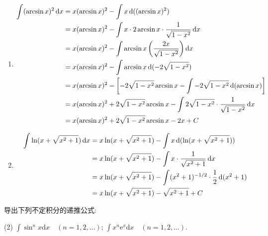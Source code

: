 \begin{solution}
\begin{enumerate}
        \item %
              \begin{align*}
                  \int (\arcsin x)^2 \operatorname{d\!} x & = x (\arcsin x)^2 - \int x \operatorname{d}((\arcsin x)^2)                                                      \\
                                            & = x (\arcsin x)^2 - \int x \cdot 2 \arcsin x \cdot \frac{1}{\sqrt{1-x^2}} \operatorname{d\!} x                     \\
                                            & = x (\arcsin x)^2 - \int \arcsin x \left( \frac{2x}{\sqrt{1-x^2}} \right) \operatorname{d\!} x                     \\
                                            & = x (\arcsin x)^2 - \int \arcsin x \operatorname{d}(-2\sqrt{1-x^2})                                             \\
                                            & = x (\arcsin x)^2 - \left[ -2\sqrt{1-x^2} \arcsin x - \int -2\sqrt{1-x^2} \operatorname{d}(\arcsin x) \right]   \\
                                            & = x (\arcsin x)^2 + 2\sqrt{1-x^2} \arcsin x - \int 2\sqrt{1-x^2} \cdot \frac{1}{\sqrt{1-x^2}} \operatorname{d\!} x \\
                                            & = x (\arcsin x)^2 + 2\sqrt{1-x^2} \arcsin x - 2x + C
              \end{align*}

        \item %
              \begin{align*}
                  \int \ln(x + \sqrt{x^2 + 1}) \operatorname{d\!} x & = x \ln(x + \sqrt{x^2 + 1}) - \int x \operatorname{d}(\ln(x + \sqrt{x^2 + 1}))                  \\
                                                      & = x \ln(x + \sqrt{x^2 + 1}) - \int x \cdot \frac{1}{\sqrt{x^2 + 1}} \operatorname{d\!} x           \\
                                                      & = x \ln(x + \sqrt{x^2 + 1}) - \int (x^2 + 1)^{-1/2} \cdot \frac{1}{2} \operatorname{d}(x^2 + 1) \\
                                                      & = x \ln(x + \sqrt{x^2 + 1}) - \sqrt{x^2 + 1} + C
              \end{align*}
    \end{enumerate}
\end{solution}

\begin{exercise}[4.1.6]
    导出下列不定积分的递推公式:
    \begin{tasks}(2)
        \task $\displaystyle \int \sin^n x \mathrm{d}x \quad (n = 1, 2, \dots)$;
        \task $\displaystyle \int x^n \mathrm{e}^x \mathrm{d}x \quad (n = 1, 2, \dots)$.
    \end{tasks}
\end{exercise}


